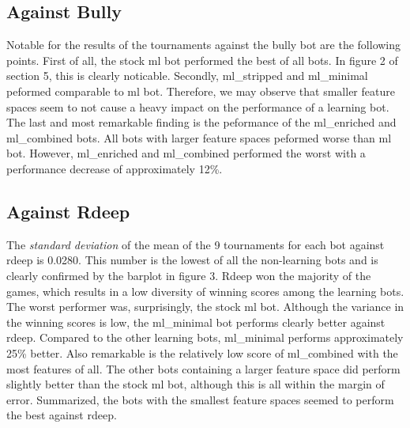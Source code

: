 \documentclass[a4paper,11pt]{article}
\begin{document}
\subsection*{Against Bully}

Notable for the results of the tournaments against the bully bot are the following points. First of all, the stock ml bot performed the best of all bots. In figure 2 of section 5, this is clearly noticable. Secondly,  ml\_stripped and ml\_minimal peformed comparable to ml bot. Therefore, we may observe that smaller feature spaces seem to not cause a heavy impact on the performance of a learning bot. The last and most remarkable finding is the peformance of the ml\_enriched and ml\_combined bots. All bots with larger feature spaces peformed worse than ml bot. However, ml\_enriched and ml\_combined performed the worst with a performance decrease of approximately 12\%.


\subsection*{Against Rdeep}
The \textit{standard deviation} of the mean of the 9 tournaments for each bot against rdeep is 0.0280. This number is the lowest of all the non-learning bots and is clearly confirmed by the barplot in figure 3. Rdeep won the majority of the games, which results in a low diversity of winning scores among the learning bots. The worst performer was, surprisingly, the stock ml bot. Although the variance in the winning scores is low, the ml\_minimal bot performs clearly better against rdeep. Compared to the other learning bots, ml\_minimal performs approximately 25\% better. Also remarkable is the relatively low score of ml\_combined with the most features of all. The other bots containing a larger feature space did perform slightly better than the stock ml bot, although this is all within the margin of error.  Summarized, the bots with the smallest feature spaces seemed to perform the best against rdeep.
\end{document}
